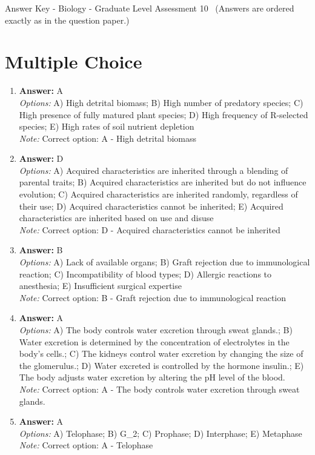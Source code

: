\documentclass[12pt]{article}
\begin{document}
\begin{center}
Answer Key - Biology - Graduate Level Assessment 10 \
\small (Answers are ordered exactly as in the question paper.)
\end{center}

\section*{Multiple Choice}
\begin{enumerate}[label=\arabic*.]
\item \textbf{Answer:} A
\\ \textit{Options:} A) High detrital biomass; B) High number of predatory species; C) High presence of fully matured plant species; D) High frequency of R-selected species; E) High rates of soil nutrient depletion
\\ \textit{Note:} Correct option: A - High detrital biomass
\item \textbf{Answer:} D
\\ \textit{Options:} A) Acquired characteristics are inherited through a blending of parental traits; B) Acquired characteristics are inherited but do not influence evolution; C) Acquired characteristics are inherited randomly, regardless of their use; D) Acquired characteristics cannot be inherited; E) Acquired characteristics are inherited based on use and disuse
\\ \textit{Note:} Correct option: D - Acquired characteristics cannot be inherited
\item \textbf{Answer:} B
\\ \textit{Options:} A) Lack of available organs; B) Graft rejection due to immunological reaction; C) Incompatibility of blood types; D) Allergic reactions to anesthesia; E) Insufficient surgical expertise
\\ \textit{Note:} Correct option: B - Graft rejection due to immunological reaction
\item \textbf{Answer:} A
\\ \textit{Options:} A) The body controls water excretion through sweat glands.; B) Water excretion is determined by the concentration of electrolytes in the body's cells.; C) The kidneys control water excretion by changing the size of the glomerulus.; D) Water excreted is controlled by the hormone insulin.; E) The body adjusts water excretion by altering the pH level of the blood.
\\ \textit{Note:} Correct option: A - The body controls water excretion through sweat glands.
\item \textbf{Answer:} A
\\ \textit{Options:} A) Telophase; B) G\_2; C) Prophase; D) Interphase; E) Metaphase
\\ \textit{Note:} Correct option: A - Telophase
\end{enumerate}
\end{document}
